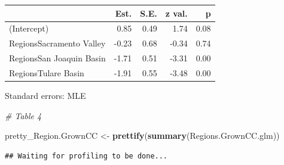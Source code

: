 \documentclass[12pt,]{article}
\newenvironment{Shaded}{\begin{snugshade}}{\end{snugshade}}
\newcommand{\KeywordTok}[1]{\textcolor[rgb]{0.13,0.29,0.53}{\textbf{#1}}}
\newcommand{\DataTypeTok}[1]{\textcolor[rgb]{0.13,0.29,0.53}{#1}}
\newcommand{\DecValTok}[1]{\textcolor[rgb]{0.00,0.00,0.81}{#1}}
\newcommand{\StringTok}[1]{\textcolor[rgb]{0.31,0.60,0.02}{#1}}
\newcommand{\CommentTok}[1]{\textcolor[rgb]{0.56,0.35,0.01}{\textit{#1}}}
\newcommand{\OtherTok}[1]{\textcolor[rgb]{0.56,0.35,0.01}{#1}}
\newcommand{\OperatorTok}[1]{\textcolor[rgb]{0.81,0.36,0.00}{\textbf{#1}}}
\newcommand{\NormalTok}[1]{#1}
\begin{document}
\begin{table}[!h]
\centering
\begin{threeparttable}
\begin{tabular}{lrrrr}
\toprule
  & Est. & S.E. & z val. & p\\
\midrule
\rowcolor{gray!6}  (Intercept) & 0.85 & 0.49 & 1.74 & 0.08\\
RegionsSacramento Valley & -0.23 & 0.68 & -0.34 & 0.74\\
\rowcolor{gray!6}  RegionsSan Joaquin Basin & -1.71 & 0.51 & -3.31 & 0.00\\
RegionsTulare Basin & -1.91 & 0.55 & -3.48 & 0.00\\
\bottomrule
\end{tabular}
\begin{tablenotes}
\item Standard errors: MLE
\end{tablenotes}
\end{threeparttable}
\end{table}

\begin{Shaded}
\begin{Highlighting}[]
\CommentTok{# Table 4}

\NormalTok{pretty_Region.GrownCC <-}\StringTok{ }\KeywordTok{prettify}\NormalTok{(}\KeywordTok{summary}\NormalTok{(Regions.GrownCC.glm))}
\end{Highlighting}
\end{Shaded}

\begin{verbatim}
## Waiting for profiling to be done...
\end{verbatim}

\begin{Shaded}
\end{Shaded}
\end{document}
